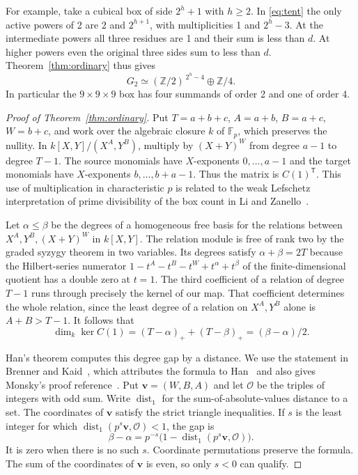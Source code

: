 \documentclass[11pt]{article}
\newcommand{\Z}{\mathbb Z}
\newcommand{\F}{\mathbb F}
\begin{document}
For example, take a cubical box of side \(2^h+1\) with \(h\ge2\). In
\eqref{eq:tent} the only active powers of 2 are \(2\) and \(2^{h+1}\),
with multiplicities 1 and \(2^h-3\). At the intermediate powers
all three residues are 1 and their sum is less than \(d\). At higher
powers even the original three sides sum to less than \(d\).
Theorem~\ref{thm:ordinary} thus gives
\[
        G_2\simeq(\Z/2)^{\,2^h-4}\oplus\Z/4 .
\]
In particular the \(9\times9\times9\) box has four summands of order 2
and one of order 4.

\begin{proof}[Proof of Theorem~\ref{thm:ordinary}]
Put \(T=a+b+c\), \(A=a+b\), \(B=a+c\), \(W=b+c\), and work over the
algebraic closure \(k\) of \(\F_p\), which preserves the nullity.
In \(k[X,Y]/(X^A,Y^B)\), multiply by \((X+Y)^W\) from degree \(a-1\)
to degree \(T-1\). The source monomials have \(X\)-exponents
\(0,\ldots,a-1\) and the target monomials have \(X\)-exponents
\(b,\ldots,b+a-1\). Thus the matrix is \(C(1)^{\mathsf T}\).
This use of multiplication in characteristic \(p\) is related to the
weak Lefschetz interpretation of prime divisibility of the box count in
Li and Zanello~\cite[Theorem~4.2]{LZ}.

Let \(\alpha\le\beta\) be the degrees of a homogeneous free basis for the
relations between \(X^A,Y^B,(X+Y)^W\) in \(k[X,Y]\). The relation module
is free of rank two by the graded syzygy theorem in two variables.
Its degrees satisfy \(\alpha+\beta=2T\) because the Hilbert-series numerator
\(1-t^A-t^B-t^W+t^\alpha+t^\beta\) of the finite-dimensional quotient
has a double zero at \(t=1\). The third coefficient of a relation of
degree \(T-1\) runs through precisely the kernel of our map. That
coefficient determines the whole relation, since the least degree of a
relation on \(X^A,Y^B\) alone is \(A+B>T-1\). It follows that
\[
      \dim_k\ker C(1)=(T-\alpha)_++(T-\beta)_+
                       =(\beta-\alpha)/2 .
\]

Han's theorem computes this degree gap by a distance. We use the
statement in Brenner and Kaid~\cite[Theorem~2.3]{BK}, which attributes
the formula to Han~\cite{Han} and also gives Monsky's proof
reference~\cite[Corollary~23]{Monsky}. Put \(\mathbf v=(W,B,A)\)
and let \(\mathcal O\) be the triples of integers with odd sum. Write
\(\operatorname{dist}_1\) for the sum-of-absolute-values distance to a
set. The coordinates of \(\mathbf v\) satisfy the strict triangle
inequalities. If \(s\) is the least integer for which
\(\operatorname{dist}_1(p^s\mathbf v,\mathcal O)<1\), the gap is
\[
 \beta-\alpha=p^{-s}\bigl(1-\operatorname{dist}_1(p^s\mathbf v,\mathcal O)\bigr).
\]
It is zero when there is no such \(s\). Coordinate permutations preserve
the formula. The sum of the coordinates of \(\mathbf v\) is even, so
only \(s<0\) can qualify.


\end{proof}
\end{document}
